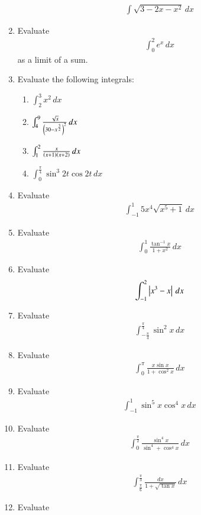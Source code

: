 \begin{enumerate}[label=\arabic*.,ref=\thesubsection.\theenumi]
\begin{align}
\int \sqrt{3-2x-x^2}\,dx
\end{align}
%
\item Evaluate
\begin{align}
\int_{0}^{2} e^x\,dx
\end{align}
%
as a limit of a sum.
%
\item Evaluate the following integrals:
\begin{enumerate}
%
\item  $\int_{2}^{3}x^2 \,dx$
\item  $\int_{4}^{9}\frac{\sqrt{x}}{\left(30-x^{\frac{3}{2}}\right)^2}\,dx$
\item  $\int_{1}^{2}\frac{x}{\left(x+1\right)\left(x+2\right)}\,dx$
\item  $\int_{0}^{\frac{\pi}{4}}\sin^3 2t \cos 2t\,dx$
%
\end{enumerate}
%
\item Evaluate
\begin{align}
\int_{-1}^{1} 5x^4\sqrt{x^5+1}\,dx
\end{align}
%
\item Evaluate
\begin{align}
\int_{0}^{1} \frac{\tan ^{-1}x}{1+x^2}\,dx
\end{align}
%
\item Evaluate
\begin{align}
\int_{-1}^{2} \left\vert x^3-x\right\vert\,dx
\end{align}
%
\item Evaluate
\begin{align}
\int_{-\frac{\pi}{4}}^{\frac{\pi}{4}}\sin^2 x\,dx
\end{align}
%
\item Evaluate
\begin{align}
\int_{0}^{\pi}\frac{x\sin x}{1+\cos^2 x}\,dx
\end{align}
%
\item Evaluate
\begin{align}
\int_{-1}^{1}\sin^5 x \cos^{4} x\,dx
\end{align}
%
\item Evaluate
\begin{align}
\int_{0}^{\frac{\pi}{2}}\frac{\sin^4 x}{\sin^4+\cos^4 x}\,dx
\end{align}
%
\item Evaluate
\begin{align}
\int_{\frac{\pi}{6}}^{\frac{\pi}{3}}\frac{dx}{1+\sqrt{\tan x}}\,dx
\end{align}
%
\item Evaluate

\end{enumerate}
